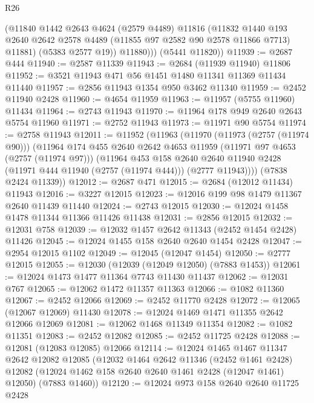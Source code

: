 \begin{lexlean}{R26}
\begin{coremodule}
            (@11840
              @1442
              @2643
              @4624
              (@2579 @4489)
              @11816
              (@11832
                @1440
                @193
                @2640
                @2642
                @2578
                @4489
                (@11855 @97 @2582 @90 @2578 @11866 @7713)
                @11881)
              (@5383 @2577 @19))
            @11880)))
      (@5441 @11820))
@11939 := @2687 @444
@11940 := @2587 @11339
@11943 := @2684 (@11939 @11940) @11806
@11952 := @3521 @11943 @471 @56 @1451 @1480 @11341 @11369 @11434 @11440
@11957 := @2856 @11943 @1354 @950 @3462 @11340
@11959 := @2452 @11940 @2428
@11960 := @4654 @11959
@11963 := @11957 (@5755 @11960) @11434
@11964 := @2743 @11943
@11970 := @11964 @178 @949 @2640 @2643 @5754 @11960
@11971 := @2752 @11943
@11973 := @11971 @90 @5754
@11974 := @2758 @11943
@12011 := @11952
    (@11963
      (@11970
        (@11973 (@2757 (@11974 @90)))
        (@11964
          @174
          @455
          @2640
          @2642
          @4653
          @11959
          (@11971 @97 @4653 (@2757 (@11974 @97)))
          (@11964
            @453
            @158
            @2640
            @2640
            @11940
            @2428
            (@11971 @444 @11940 (@2757 (@11974 @444)))
            (@2777 @11943))))
      (@7838 @2424 @11339))
@12012 := @2687 @471
@12015 := @2684 (@12012 @11434) @11943
@12016 := @3227 @12015
@12023 := @12016 @199 @98 @1479 @11367 @2640 @11439 @11440
@12024 := @2743 @12015
@12030 := @12024 @1458 @1478 @11344 @11366 @11426 @11438
@12031 := @2856 @12015
@12032 := @12031 @758
@12039 := @12032 @1457 @2642 @11343 (@2452 @1454 @2428) @11426
@12045 := @12024 @1455 @158 @2640 @2640 @1454 @2428
@12047 := @2954 @12015 @1102
@12049 := @12045 (@12047 @1454)
@12050 := @2777 @12015
@12055 := @12030 (@12039 (@12049 @12050) (@7883 @1453))
@12061 := @12024 @1473 @1477 @11364 @7743 @11430 @11437
@12062 := @12031 @767
@12065 := @12062 @1472 @11357 @11363
@12066 := @1082 @11360
@12067 := @2452 @12066
@12069 := @2452 @11770 @2428
@12072 := @12065 (@12067 @12069) @11430
@12078 := @12024 @1469 @1471 @11355 @2642 @12066 @12069
@12081 := @12062 @1468 @11349 @11354
@12082 := @1082 @11351
@12083 := @2452 @12082
@12085 := @2452 @11725 @2428
@12088 := @12081 (@12083 @12085) @12066
@12114 := @12024
    @1465
    @1467
    @11347
    @2642
    @12082
    @12085
    (@12032
      @1464
      @2642
      @11346
      (@2452 @1461 @2428)
      @12082
      (@12024 @1462 @158 @2640 @2640 @1461 @2428 (@12047 @1461) @12050)
      (@7883 @1460))
@12120 := @12024 @973 @158 @2640 @2640 @11725 @2428

\end{coremodule}
\end{lexlean}
